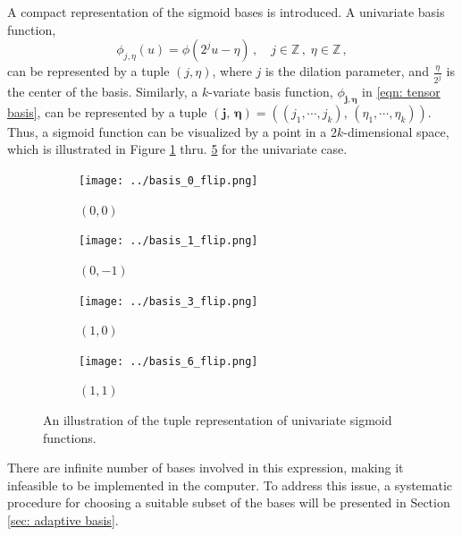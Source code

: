 A compact representation of the sigmoid bases is introduced.
A univariate basis function,
\begin{equation*}
    {\phi}_{j,\eta}(u) = {\phi}(2^j u-\eta) \,,\quad j\in \mathbb{Z} \,,\;\eta \in \mathbb{Z}\,,
    \label{eqn: self similar sigmoid}
\end{equation*}
can be represented by a tuple $(j, \eta)$,
where $j$ is the dilation parameter, and $\frac{\eta}{2^j}$ is
the center of the basis.
Similarly, a $k$-variate basis function, $\phi_{\boldsymbol{j}, \boldsymbol{\eta}}$ in
\eqref{eqn: tensor basis}, can be represented by a tuple $\left(\boldsymbol{j}, \,
\boldsymbol{\eta}\right) 
= \left((j_1,\cdots, j_k), \, \left(\eta_1, \cdots, \eta_k\right)\right)$.
Thus, a sigmoid function can be visualized by a point in a $2k$-dimensional space,
which is illustrated in Figure \ref{fig: basis 0} thru. \ref{fig: basis 3} 
for the univariate case.\\
\begin{figure}[htbp]\begin{center}
    \begin{subfigure}[t]{.49\textwidth}
        \centering
        \texttt{[image: ../basis\_0\_flip.png]}
        \caption{$\left(0,0\right)$}
        \label{fig: basis 0}
    \end{subfigure} \hspace{.0cm}
    \begin{subfigure}[t]{.49\textwidth}
        \centering
        \texttt{[image: ../basis\_1\_flip.png]}
        \caption{$\left(0, -1\right)$}
        \label{fig: basis 1}
    \end{subfigure}
    \begin{subfigure}[t]{.49\textwidth}
        \centering
        \texttt{[image: ../basis\_3\_flip.png]}
        \caption{$\left(1, 0\right)$}
        \label{fig: basis 2}
    \end{subfigure} \hspace{.0cm}
    \begin{subfigure}[t]{.49\textwidth}
        \centering
        \texttt{[image: ../basis\_6\_flip.png]}
        \caption{$\left(1, 1\right)$}
        \label{fig: basis 3}
    \end{subfigure}
    \caption{An illustration of the tuple representation of univariate sigmoid functions.}
\end{center}\end{figure}

There are infinite number of bases involved
in this expression, making it infeasible to be implemented in the computer. To address this issue,
a systematic procedure for choosing
a suitable subset of the bases %
will be presented in Section \ref{sec: adaptive basis}.\\



